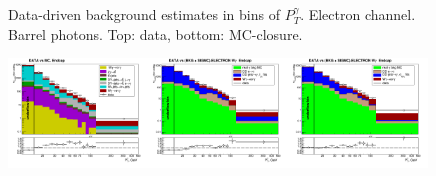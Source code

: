 \begin{figure}[htb]
\begin{center}
  \caption{Data-driven background estimates in bins of $P_T^{\gamma}$. Electron channel. Barrel photons. Top: data, bottom: MC-closure. }
  \end{center}
\end{figure}

\begin{figure}[htb]
  \begin{center}
   \includegraphics[width=0.33\textwidth]{../figs/figs_v11/ELECTRON_WGamma/PrepareYields/c_TotalDATAvsMC_Endcap__phoEt.png}\includegraphics[width=0.33\textwidth]{../figs/figs_v11/ELECTRON_WGamma/PrepareYields/c_DATAvsBkgPlusSigMCc_ELECTRON_WGamma_TEMPL_CHISO_UNblind__Endcap__phoEt.png}\includegraphics[width=0.33\textwidth]{../figs/figs_v11/ELECTRON_WGamma/PrepareYields/c_DATAvsBkgPlusSigMCc_ELECTRON_WGamma_TEMPL_SIHIH_UNblind__Endcap__phoEt.png}

\end{center}
\end{figure}
